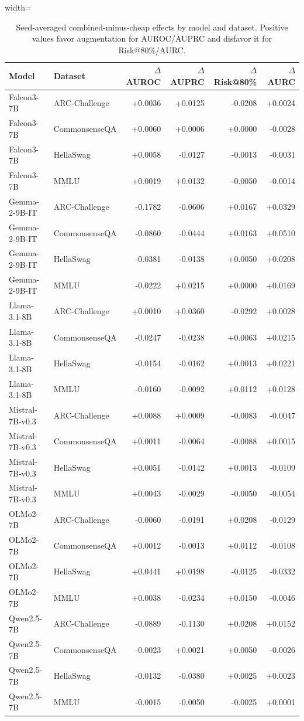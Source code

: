 \begin{table}[t]
\centering
\small
\caption{Seed-averaged combined-minus-cheap effects by model and dataset. Positive values favor augmentation for AUROC/AUPRC and disfavor it for Risk@80\%/AURC.}
\label{tab:model-dataset-effects}
\begin{adjustbox}{width=\textwidth}
\begin{tabular}{llrrrr}
\toprule
Model & Dataset & $\Delta$ AUROC & $\Delta$ AUPRC & $\Delta$ Risk@80\% & $\Delta$ AURC \\
\midrule
Falcon3-7B & ARC-Challenge & +0.0036 & +0.0125 & -0.0208 & +0.0024 \\
Falcon3-7B & CommonsenseQA & +0.0060 & +0.0006 & +0.0000 & -0.0028 \\
Falcon3-7B & HellaSwag & +0.0058 & -0.0127 & -0.0013 & -0.0031 \\
Falcon3-7B & MMLU & +0.0019 & +0.0132 & -0.0050 & -0.0014 \\
Gemma-2-9B-IT & ARC-Challenge & -0.1782 & -0.0606 & +0.0167 & +0.0329 \\
Gemma-2-9B-IT & CommonsenseQA & -0.0860 & -0.0444 & +0.0163 & +0.0510 \\
Gemma-2-9B-IT & HellaSwag & -0.0381 & -0.0138 & +0.0050 & +0.0208 \\
Gemma-2-9B-IT & MMLU & -0.0222 & +0.0215 & +0.0000 & +0.0169 \\
Llama-3.1-8B & ARC-Challenge & +0.0010 & +0.0360 & -0.0292 & +0.0028 \\
Llama-3.1-8B & CommonsenseQA & -0.0247 & -0.0238 & +0.0063 & +0.0215 \\
Llama-3.1-8B & HellaSwag & -0.0154 & -0.0162 & +0.0013 & +0.0221 \\
Llama-3.1-8B & MMLU & -0.0160 & -0.0092 & +0.0112 & +0.0128 \\
Mistral-7B-v0.3 & ARC-Challenge & +0.0088 & +0.0009 & -0.0083 & -0.0047 \\
Mistral-7B-v0.3 & CommonsenseQA & +0.0011 & -0.0064 & -0.0088 & +0.0015 \\
Mistral-7B-v0.3 & HellaSwag & +0.0051 & -0.0142 & +0.0013 & -0.0109 \\
Mistral-7B-v0.3 & MMLU & +0.0043 & -0.0029 & -0.0050 & -0.0054 \\
OLMo2-7B & ARC-Challenge & -0.0060 & -0.0191 & +0.0208 & -0.0129 \\
OLMo2-7B & CommonsenseQA & +0.0012 & -0.0013 & +0.0112 & -0.0108 \\
OLMo2-7B & HellaSwag & +0.0441 & +0.0198 & -0.0125 & -0.0332 \\
OLMo2-7B & MMLU & +0.0038 & -0.0234 & +0.0150 & -0.0046 \\
Qwen2.5-7B & ARC-Challenge & -0.0889 & -0.1130 & +0.0208 & +0.0152 \\
Qwen2.5-7B & CommonsenseQA & -0.0023 & +0.0021 & +0.0050 & -0.0026 \\
Qwen2.5-7B & HellaSwag & -0.0132 & -0.0380 & +0.0025 & +0.0023 \\
Qwen2.5-7B & MMLU & -0.0015 & -0.0050 & -0.0025 & +0.0001 \\
\bottomrule
\end{tabular}
\end{adjustbox}
\end{table}
